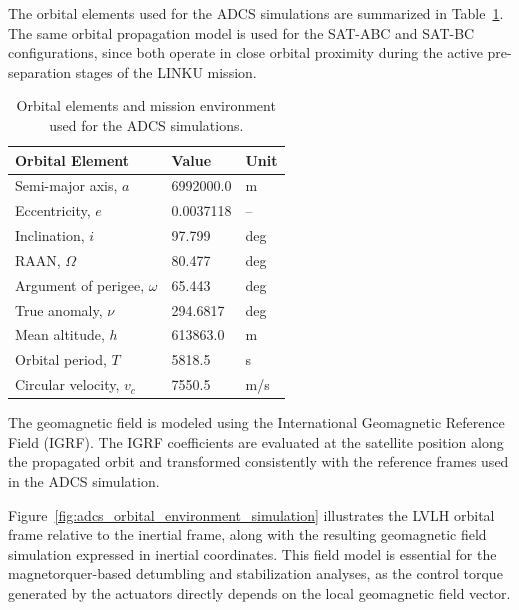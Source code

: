 The orbital elements used for the ADCS simulations are summarized in Table~\ref{tab:adcs_orbit_params}. The same orbital propagation model is used for the SAT-ABC and SAT-BC configurations, since both operate in close orbital proximity during the active pre-separation stages of the LINKU mission.

\begin{table}[ht]
\centering
\caption{Orbital elements and mission environment used for the ADCS simulations.}
\label{tab:adcs_orbit_params}
\begin{tabular}{lll}
\toprule
\textbf{Orbital Element} & \textbf{Value} & \textbf{Unit} \\
\midrule
Semi-major axis, \(a\) & 6992000.0 & m \\
Eccentricity, \(e\) & 0.0037118 & -- \\
Inclination, \(i\) & 97.799 & deg \\
RAAN, \(\Omega\) & 80.477 & deg \\
Argument of perigee, \(\omega\) & 65.443 & deg \\
True anomaly, \(\nu\) & 294.6817 & deg \\
\midrule
Mean altitude, \(h\) & 613863.0 & m \\
Orbital period, \(T\) & 5818.5 & s \\
Circular velocity, \(v_c\) & 7550.5 & m/s \\
\bottomrule
\end{tabular}
\end{table}

The geomagnetic field is modeled using the International Geomagnetic Reference Field (IGRF). The IGRF coefficients are evaluated at the satellite position along the propagated orbit and transformed consistently with the reference frames used in the ADCS simulation. 

Figure~\ref{fig:adcs_orbital_environment_simulation} illustrates the LVLH orbital frame relative to the inertial frame, along with the resulting geomagnetic field simulation expressed in inertial coordinates. This field model is essential for the magnetorquer-based detumbling and stabilization analyses, as the control torque generated by the actuators directly depends on the local geomagnetic field vector.


